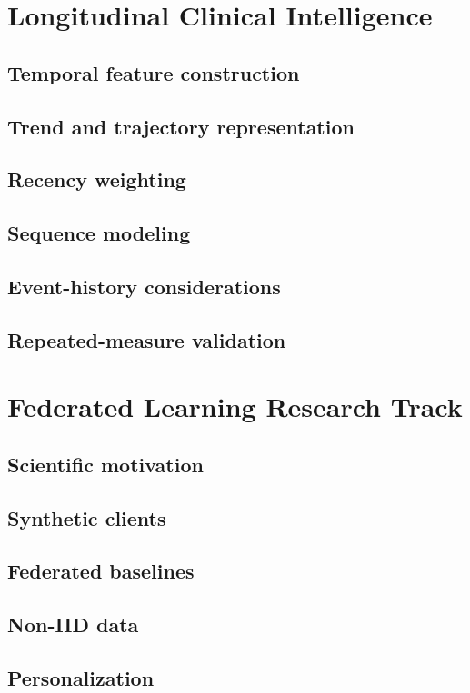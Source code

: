 \documentclass[11pt,journal,onecolumn,draftclsnofoot]{IEEEtran}
\begin{document}
\section{Longitudinal Clinical Intelligence}
\subsection{Temporal feature construction}
\subsection{Trend and trajectory representation}
\subsection{Recency weighting}
\subsection{Sequence modeling}
\subsection{Event-history considerations}
\subsection{Repeated-measure validation}

\section{Federated Learning Research Track}
\subsection{Scientific motivation}
\subsection{Synthetic clients}
\subsection{Federated baselines}
\subsection{Non-IID data}
\subsection{Personalization}
\end{document}
